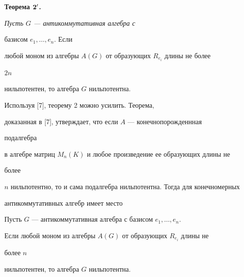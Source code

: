 \medskip 


 


{\bf Теорема $\bold 2'$.} {\it Пусть $G$ --- антикоммутативная алгебра с 


базисом $e_1,\dotsc,e_n$. Если 


любой моном из алгебры $A(G)$ от образующих $R_{e_i}$ длины не более 


$2n$ 


нильпотентен, то алгебра $G$ нильпотентна.} 


\medskip 


 


Используя [7], теорему 2 можно усилить. Теорема, 


доказанная в [7], утверждает, что если $A$ --- конечнопорожденнная 


подалгебра 


в алгебре матриц $M_n(K)$ и любое произведение ее образующих длины не 


более 


$n$ нильпотентно, то и сама подалгебра нильпотентна. Тогда для конечномерных 


антикоммутативных алгебр имеет место 


 


\begin{thm} 


Пусть $G$ --- антикоммутативная алгебра с базисом $e_1,\dotsc,e_n$. 


Если любой моном из алгебры $A(G)$ от образующих $R_{e_i}$ длины не 


более $n$ 


нильпотентен, то алгебра $G$ нильпотентна. 


\end{thm} 


 


 


